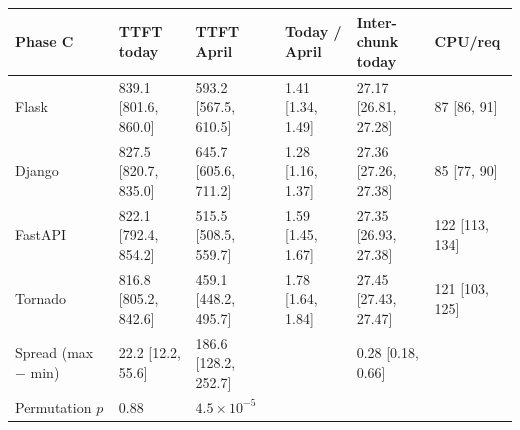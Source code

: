 \begin{table}[tbp]
  \vspace{6pt}
  \begin{tabular}{@{}llllll@{}}
    \toprule
    Phase C & TTFT today & TTFT April & Today / April & Inter-chunk today & CPU/req \\
    \midrule
    Flask & 839.1 [801.6, 860.0] & 593.2 [567.5, 610.5] & 1.41 [1.34, 1.49] & 27.17 [26.81, 27.28] & 87 [86, 91] \\
    Django & 827.5 [820.7, 835.0] & 645.7 [605.6, 711.2] & 1.28 [1.16, 1.37] & 27.36 [27.26, 27.38] & 85 [77, 90] \\
    FastAPI & 822.1 [792.4, 854.2] & 515.5 [508.5, 559.7] & 1.59 [1.45, 1.67] & 27.35 [26.93, 27.38] & 122 [113, 134] \\
    Tornado & 816.8 [805.2, 842.6] & 459.1 [448.2, 495.7] & 1.78 [1.64, 1.84] & 27.45 [27.43, 27.47] & 121 [103, 125] \\
    \addlinespace
    Spread (max $-$ min) & 22.2 [12.2, 55.6] & 186.6 [128.2, 252.7] & & 0.28 [0.18, 0.66] & \\
    Permutation $p$ & 0.88 & $4.5\times 10^{-5}$ & & & \\
    \bottomrule
  \end{tabular}
\end{table}
